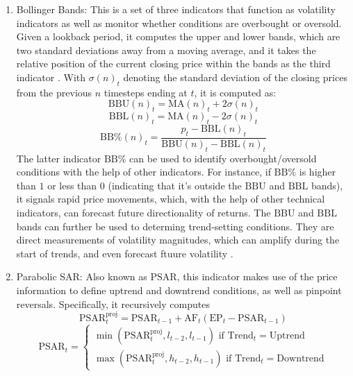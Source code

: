 \documentclass[stu,floatsintext]{apa7}
\begin{document}
\begin{enumerate}
\item Bollinger Bands: This is a set of three indicators that function as volatility indicators as well as monitor whether conditions are overbought or oversold. Given a lookback period, it computes the upper and lower bands, which are two standard deviations away from a moving average, and it takes the relative position of the current closing price within the bands as the third indicator \parencite{deep2024bb}. With $\sigma(n)_t$ denoting the standard deviation of the closing prices from the previous $n$ timesteps ending at $t$, it is computed as:
\begin{equation}\text{BBU}(n)_t=\text{MA}(n)_t+2\sigma(n)_t\end{equation}
\begin{equation}\text{BBL}(n)_t=\text{MA}(n)_t-2\sigma(n)_t\end{equation}
\begin{equation}\text{BB\%}(n)_t=\frac{p_t-\text{BBL}(n)_t}{\text{BBU}(n)_t-\text{BBL}(n)_t}\end{equation}
The latter indicator $\text{BB\%}$ can be used to identify overbought/oversold conditions with the help of other indicators. For instance, if $\text{BB\%}$ is higher than $1$ or less than $0$ (indicating that it's outside the $\text{BBU}$ and $\text{BBL}$ bands), it signals rapid price movements, which, with the help of other technical indicators, can forecast future directionality of returns. The $\text{BBU}$ and $\text{BBL}$ bands can further be used to determing trend-setting conditions. They are direct measurements of volatility magnitudes, which can amplify during the start of trends, and even forecast ftuure volatility \parencite{bollinger2001bollinger}.
\item Parabolic SAR: Also known as $\text{PSAR}$, this indicator makes use of the price information to define uptrend and downtrend conditions, as well as pinpoint reversals. Specifically, it recursively computes
\begin{equation}\text{PSAR}_t^{\text{proj}}=\text{PSAR}_{t-1}+\text{AF}_t(\text{EP}_t-\text{PSAR}_{t-1})\end{equation}
\begin{equation}\text{PSAR}_t=\begin{cases}
\min(\text{PSAR}_t^{\text{proj}},l_{t-2},l_{t-1})\text{ if Trend}_t=\text{Uptrend}\\
\max(\text{PSAR}_t^{\text{proj}},h_{t-2},h_{t-1})\text{ if Trend}_t=\text{Downtrend}
\end{cases}\end{equation}

\end{enumerate}
\end{document}
